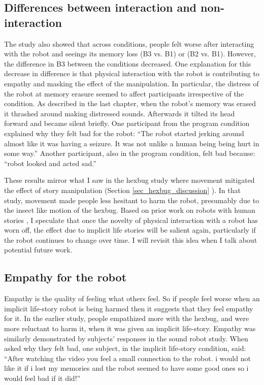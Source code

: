 \subsection{Differences between interaction and non-interaction}

The study also showed that across conditions, people felt worse after interacting with the robot and seeings its memory loss (B3 vs. B1) or (B2 vs. B1). However, the difference in B3 between the conditions decreased. One explanation for this decrease in difference is that physical interaction with the robot is contributing to empathy and masking the effect of the manipulation. In particular, the distress of the robot at memory erasure seemed to affect participants irrespective of the condition.  As described in the last chapter, when the robot's memory was erased it thrashed around making distressed sounds. Afterwards it tilted its head forward and became silent briefly. One participant from the program condition explained why they felt bad for the robot: ``The robot started jerking around almost like it was having a seizure. It was not unlike a human being being hurt in some way.'' Another participant, also in the program condition, felt bad because: ``robot looked and acted sad.'' 

These results mirror what I saw in the hexbug study where movement mitigated the effect of story manipulation (Section \ref{sec_hexbug_discussion} ). In that study, movement made people less hesitant to harm the robot, presumably due to the insect like motion of the hexbug. Based on prior work on robots with human stories \cite{gockley_valerie_roboreceptionist}, I speculate that once the novelty of physical interaction with a robot has worn off, the effect due to implicit life stories will be salient again, particularly if the robot continues to change over time. I will revisit this idea when I talk about potential future work.


\subsection{Empathy for the robot}


Empathy is the quality of feeling what others feel. So if people feel worse when an implicit life-story robot is being harmed then it suggests that they feel empathy for it. In the earlier study, people empathized more with the hexbug, and were more reluctant to harm it, when it was given an implicit life-story. Empathy was similarly demonstrated by subjects' responses in the sound robot study. When asked why they felt bad, one subject, in the implicit life-story condition, said: ``After watching the video you feel a small connection to the robot. i would not like it if i lost my memories and the robot seemed to have some good ones so i would feel bad if it did!''

